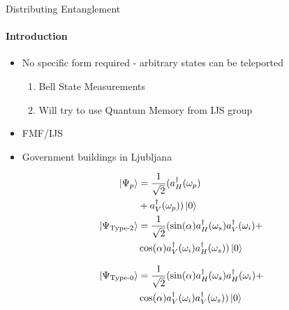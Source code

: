 \documentclass[serif,8pt]{beamer}
\begin{document}
\begin{frame}{Distributing Entanglement}
	\framesubtitle{Introduction}
	\begin{itemize}
		\item No specific form required - arbitrary states can be teleported
			\begin{enumerate}
				\item Bell State Measurements
				\item Will try to use Quantum Memory from IJS group
			\end{enumerate}
		\item FMF/IJS
		\item Government buildings in Ljubljana
	\end{itemize}
	\tiny
	\begin{minipage}[l]{0.48\textwidth}
		\begin{equation*}
		\begin{aligned}
			\ket{\Psi_{p}} &= \frac{1}{\sqrt{2}} ( a_{H}^{\dagger} ( \omega_p )\\
						   &+ a_{V}^{\dagger} ( \omega_p ) )\ket{0}\\
			\ket{\Psi_{\text{Type-2}}} &= \frac{1}{\sqrt{2}}(\sin(\alpha)a_{H}^{\dagger}(\omega_s)a_{V}^{\dagger}(\omega_i)+\\
								&\cos(\alpha)a_{V}^{\dagger}(\omega_i)a_{H}^{\dagger}(\omega_s))\ket{0}\\
		\end{aligned}
		\end{equation*}
	\end{minipage}
	\begin{minipage}[r]{0.48\textwidth}
	\begin{equation*}
		\begin{aligned}
			\ket{\Psi_{\text{Type-0}}} &= \frac{1}{\sqrt{2}}(\sin(\alpha)a_{H}^{\dagger}(\omega_s)a_{H}^{\dagger}(\omega_i)+\\
									   &\cos(\alpha)a_{V}^{\dagger}(\omega_i)a_{V}^{\dagger}(\omega_s))\ket{0}
		\end{aligned}
	\end{equation*}
	\end{minipage}
	\normalsize
\end{frame}
\end{document}
